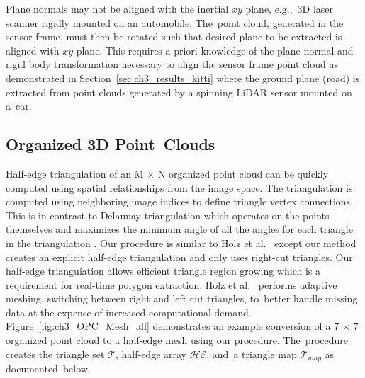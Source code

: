 Plane normals may not be aligned with the inertial $xy$ plane, e.g.,~3D laser scanner rigidly mounted on an automobile. The~point cloud, generated in the sensor frame, must then be rotated such that desired plane to be extracted is aligned with $xy$ plane. This requires a priori knowledge of the plane normal and rigid body transformation necessary to align the sensor frame point cloud as demonstrated in Section~\ref{sec:ch3_results_kitti} where the ground plane (road) is extracted from point clouds generated by a spinning LiDAR sensor mounted on a~car.



\subsection{Organized 3D Point~Clouds}\label{sec:ch3_methods_mesh_opc}


Half-edge triangulation of an M $\times$ N organized point cloud can be quickly computed using spatial relationships from the image space. The triangulation is computed using neighboring image indices to define triangle vertex connections. This is in contrast to Delaunay triangulation which operates on the points themselves and maximizes the minimum angle of all the angles for each triangle in the triangulation \cite{de_berg_delaunay_2008}. Our procedure is similar to Holz et al.~\cite{lee_fast_2013} except our method creates an explicit half-edge triangulation and only uses right-cut triangles. Our half-edge triangulation allows efficient triangle region growing which is a requirement for real-time polygon extraction.  Holz et al.~\cite{lee_fast_2013} performs adaptive meshing, switching between right and left cut triangles, to~better handle missing data at the expense of increased computational demand. Figure~\ref{fig:ch3_OPC_Mesh_all} demonstrates an example conversion of a 7 $\times$ 7 organized point cloud to a half-edge mesh using our procedure. The~procedure creates the triangle set $\mathcal{T}$, half-edge array $ \mathcal{HE}$, and~a triangle map $\mathcal{T}_{map}$ as documented~below.


